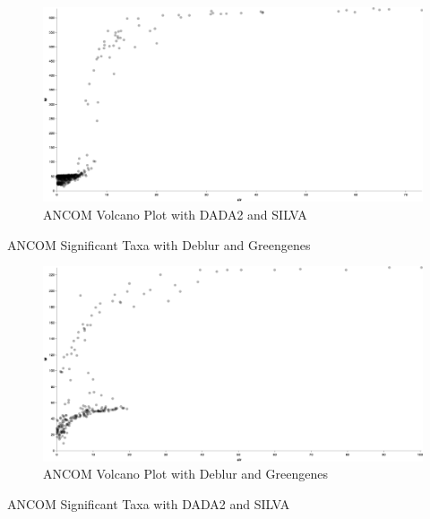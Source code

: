 \documentclass[a4paper]{article}
\begin{document}
            \begin{figure}[p]
                \centering
                \includegraphics[width=0.8 \linewidth]{figures/ANCOM/DADA2.silva.png}
                \caption{ANCOM Volcano Plot with DADA2 and SILVA}
                \label{fig:volcano-dada2-silva}
            \end{figure}

            \begin{table}[p]
                \centering
                \caption{ANCOM Significant Taxa with Deblur and Greengenes}
                \label{tb:ANCOM-deblur-gg}

            \end{table}

            \begin{figure}[p]
                \centering
                \includegraphics[width=0.8 \linewidth]{figures/ANCOM/Deblur.gg.png}
                \caption{ANCOM Volcano Plot with Deblur and Greengenes}
                \label{fig:volcano-deblur-gg}
            \end{figure}

            \begin{table}[p]
                \centering
                \caption{ANCOM Significant Taxa with DADA2 and SILVA}
                \label{tb:ANCOM-deblur-silva}

            \end{table}
\end{document}
